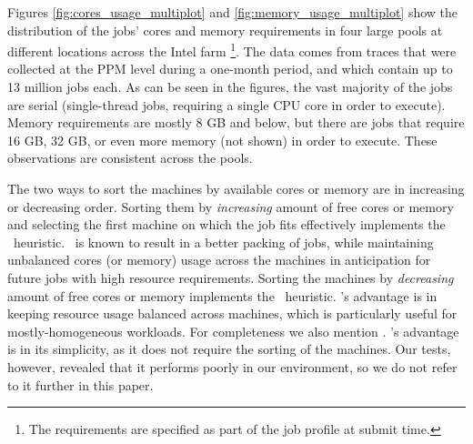 Figures \ref{fig:cores_usage_multiplot} and \ref{fig:memory_usage_multiplot}
show the distribution of the jobs' cores and memory requirements in four large pools at different locations across the Intel farm%
\footnote{The requirements are specified as part of the job profile at submit time.}.
The data comes from traces \cite{parallel13} that were collected at the PPM
level during a one-month period, and which contain up to 13 million jobs each.
As can be seen in the figures, the vast majority of the jobs are
serial (single-thread jobs, requiring a single CPU core in order to execute).
Memory requirements are mostly 8 GB and below, but there are jobs that
require 16 GB, 32 GB, or even more memory (not shown) in order to
execute.
These observations are consistent across the pools.




The two ways to sort the machines by available cores or memory are in
increasing or decreasing order.
Sorting them by \textit{increasing} amount of free cores or memory and
selecting the first machine on which the job fits effectively
implements the \bef\ heuristic.
\bef\ is known to result in a better packing of jobs, while
maintaining unbalanced cores (or memory) usage across the machines in
anticipation for future jobs with high resource requirements.
Sorting the machines by \textit{decreasing} amount of free cores or
memory implements the \wof\ heuristic.
\wof's advantage is in keeping resource usage balanced across
machines, which is particularly useful for mostly-homogeneous
workloads.
For completeness we also mention \fif.
\fif's advantage is in its simplicity, as it does not require the
sorting of the machines.
Our tests, however, revealed that it performs poorly in our
environment, so we do not refer to it further in this paper.

